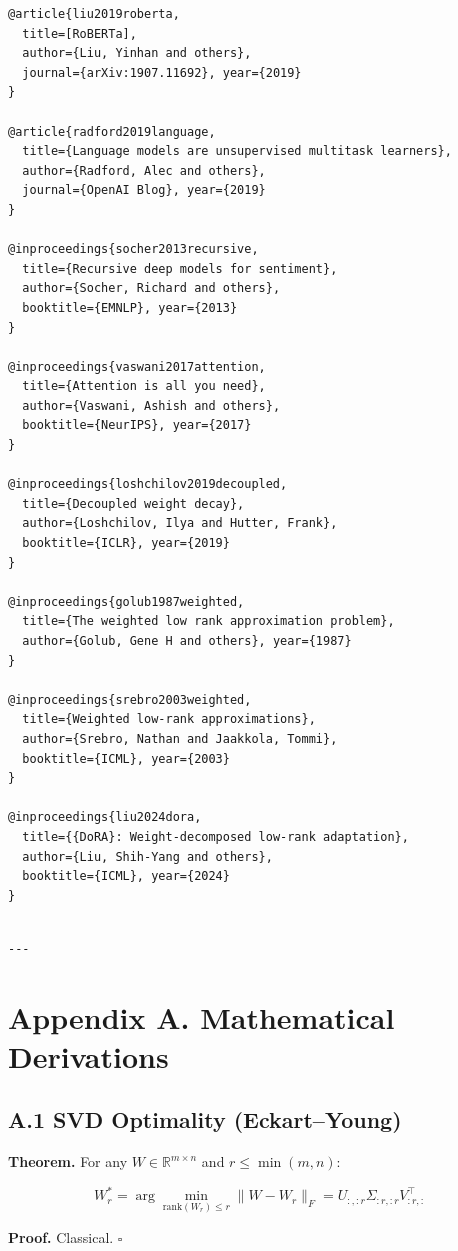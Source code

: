 \begin{lstlisting}
@article{liu2019roberta,
  title=[RoBERTa],
  author={Liu, Yinhan and others},
  journal={arXiv:1907.11692}, year={2019}
}

@article{radford2019language,
  title={Language models are unsupervised multitask learners},
  author={Radford, Alec and others},
  journal={OpenAI Blog}, year={2019}
}

@inproceedings{socher2013recursive,
  title={Recursive deep models for sentiment},
  author={Socher, Richard and others},
  booktitle={EMNLP}, year={2013}
}

@inproceedings{vaswani2017attention,
  title={Attention is all you need},
  author={Vaswani, Ashish and others},
  booktitle={NeurIPS}, year={2017}
}

@inproceedings{loshchilov2019decoupled,
  title={Decoupled weight decay},
  author={Loshchilov, Ilya and Hutter, Frank},
  booktitle={ICLR}, year={2019}
}

@inproceedings{golub1987weighted,
  title={The weighted low rank approximation problem},
  author={Golub, Gene H and others}, year={1987}
}

@inproceedings{srebro2003weighted,
  title={Weighted low-rank approximations},
  author={Srebro, Nathan and Jaakkola, Tommi},
  booktitle={ICML}, year={2003}
}

@inproceedings{liu2024dora,
  title={{DoRA}: Weight-decomposed low-rank adaptation},
  author={Liu, Shih-Yang and others},
  booktitle={ICML}, year={2024}
}
\end{lstlisting}
\begin{lstlisting}

---
\end{lstlisting}


\section{Appendix A. Mathematical Derivations}

\subsection{A.1 SVD Optimality (Eckart--Young)}

\textbf{Theorem.} For any $W \in \mathbb{R}^{m \times n}$ and $r \leq \min(m, n)$:

\[
W_r^* = \arg\min_{\text{rank}(W_r) \leq r} \|W - W_r\|_F = U_{:, :r} \Sigma_{:r, :r} V_{:r, :}^\top
\tag{A.1}
\]

\textbf{Proof.} Classical. $\square$

